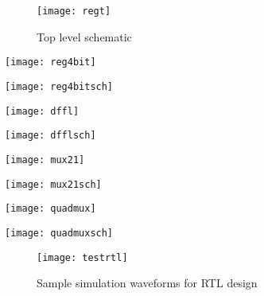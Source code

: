 \begin{figure}[ht]
  \centering
  \texttt{[image: regt]}
  \caption{Top level schematic}
  \label{fig:regt}
\end{figure} 
\FloatBarrier


	\begin{center}
	\texttt{[image: reg4bit]}
	\end{center}
\vspace{10mm}
	\begin{center}
	\texttt{[image: reg4bitsch]}
	\end{center}
\pagebreak
{}
	\begin{center}
	\texttt{[image: dffl]}
	\end{center}

	\begin{center}
	\texttt{[image: dfflsch]}
	\end{center}
	\begin{center}
	\texttt{[image: mux21]}
	\end{center}
	\begin{center}
	\texttt{[image: mux21sch]}
	\end{center}
	\begin{center}
	\texttt{[image: quadmux]}
	\end{center}
	\begin{center}
	\texttt{[image: quadmuxsch]}
	\end{center}

\begin{figure}[ht]
  \centering
  \texttt{[image: testrtl]}
  \caption{Sample simulation waveforms for RTL design}
  \label{fig:testrtl}
\end{figure} 
\FloatBarrier

